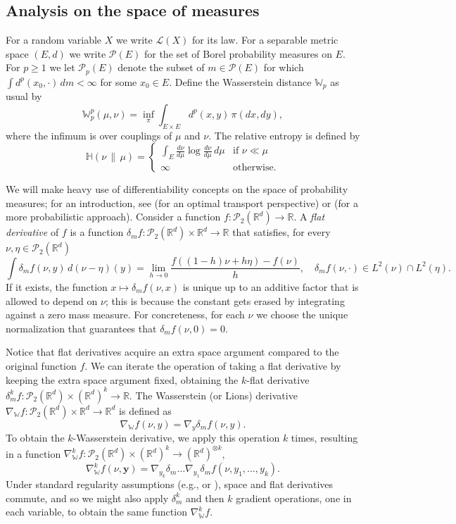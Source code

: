 \documentclass[11pt,reqno]{amsart}
\numberwithin{equation}{section}
\theoremstyle{definition}
\def\R{{\mathbb R}}
\def\Law{\mathcal{L}}
\newcommand{\wgrad}{\nabla_{\W}}
\newcommand{\W}{\mathbb W}
\newcommand{\ent}{ \mathbb H}
\begin{document}
\subsection{Analysis on the space of measures}

For a random variable $X$ we write $\Law(X)$ for its law.
For a separable metric space $(E,d)$ we write $\mathcal{P}(E)$ for the set of Borel probability measures on $E$. For $p \ge 1$ we let $\mathcal{P}_p(E)$ denote the subset of $m \in \mathcal{P}(E)$ for which $\int d^p(x_0,\cdot)\,dm < \infty$ for some $x_0 \in E$. Define the Wasserstein distance $\W_p$ as usual by
\[
\W_p^p(\mu,\nu) = \inf_\pi \int_{E \times E} d^p(x,y)\,\pi(dx,dy),
\]
where the infimum is over couplings of $\mu$ and $\nu$. The relative entropy is defined by 
\[
\ent(\nu\,\|\,\mu) = \begin{cases} \int_E \frac{d\nu}{d\mu}\log \frac{d\nu}{d\mu}\, d\mu &\text{if } \nu \ll \mu \\ \infty &\text{otherwise}. \end{cases}
\]

We will make heavy use of  differentiability concepts on the space of probability measures; for an introduction, see \cite{Ambrosio2008-dt} (for an optimal transport perspective) or \cite[Chapter 5]{Carmonabook1} (for a more probabilistic approach). Consider a function $f:\mathcal P_2(\R^d)\to \R$. A \emph{flat derivative} of $f$ is a function $\delta_m f:\mathcal P_2(\R^d)\times \R^d\to \R $ that satisfies, for every $\nu,\eta \in \mathcal P_2(\R^d)$
\begin{equation*}
\int \delta_m f(\nu,y)\,d(\nu-\eta)(y)=\lim_{h \to 0}\frac{f((1-h)\nu+h\eta)-f(\nu) }{h}, \quad \delta_m f(\nu,\cdot) \in L^2(\nu) \cap L^2(\eta).
\end{equation*}
If it exists, the function $x\mapsto \delta_m f(\nu,x)$ is unique up to an additive factor that is allowed to depend on $\nu$; this is because the constant gets erased by integrating against a zero mass measure. For concreteness, for each $\nu$ we choose the unique normalization that guarantees that $\delta_m f(\nu,0)=0$.

Notice that flat derivatives acquire an extra space argument compared to the original function $f$. We can iterate the operation of taking a flat derivative by keeping the extra space argument fixed, obtaining the $k$-flat derivative $\delta_m^k f: \mathcal P_2(\R^d)\times (\R^d)^k\to \R$.
The Wasserstein (or Lions) derivative $\wgrad f : \mathcal P_2(\R^d) \times \R^d \to \R^d$ is defined as 
\[\wgrad f(\nu,y)=\nabla_y \delta_m f(\nu,y).\]
To obtain the $k$-Wasserstein derivative, we apply this operation $k$ times, resulting in a function $\wgrad^k f : \mathcal P_2(\R^d) \times (\R^d)^k \to (\R^d)^{\otimes k}$,
\[\wgrad^k f(\nu,\boldsymbol{y})=\nabla_{y_k}\delta_m\dots \nabla_{y_1} \delta_m f(\nu,y_1,\dots,y_k).\]
Under standard regularity assumptions (e.g.,  \cite[Theorem 2.6]{Chassagneux2022-jt} or \cite[Lemma 5.4]{Buckdahn2017-op}), space and flat derivatives commute, and so we might also apply $\delta_m^k$ and then $k$ gradient operations, one in each variable, to obtain the same function $\wgrad^k f$.
\end{document}

